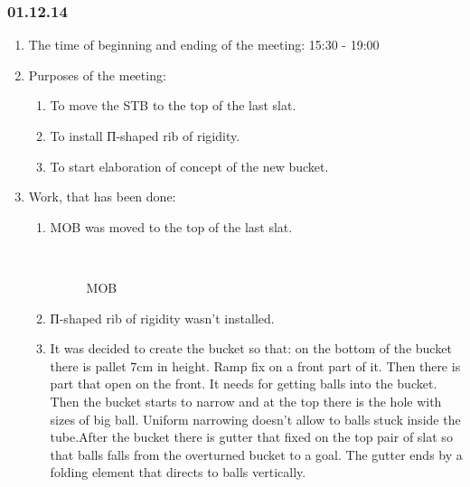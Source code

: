 \subsubsection{01.12.14}

\begin{enumerate}
	\item The time of beginning and ending of the meeting:
	15:30 - 19:00
	\item Purposes of the meeting:
	\begin{enumerate}
	  \item To move the STB to the top of the last slat.
	  
	  \item To install П-shaped rib of rigidity.
	  
	  \item To start elaboration of concept of the new bucket.
	  
    \end{enumerate}
	\item Work, that has been done:
	\begin{enumerate}
	  \item MOB was moved to the top of the last slat.
	  
	  \begin{figure}[H]
	  	\begin{minipage}[h]{0.2\linewidth}
	  		\center  
	  	\end{minipage}
	  	\begin{minipage}[h]{0.6\linewidth}
	  		\caption{MOB}
	  	\end{minipage}
	  \end{figure}
	  
	  \item П-shaped rib of rigidity wasn't installed.
	  
	  \item It was decided to create the bucket so that: on the bottom of the bucket there is pallet 7cm in height. Ramp fix on a front part of it. Then there is part that open on the front. It needs for getting balls into the bucket. Then the bucket starts to narrow and at the top there is the hole with sizes of big ball. Uniform narrowing doesn't allow to balls stuck inside the tube.After the bucket there is gutter that fixed on the top pair of slat so that balls falls from the overturned bucket to a goal. The gutter ends by a folding element that directs to balls vertically.
	  

\end{enumerate}
\end{enumerate}
